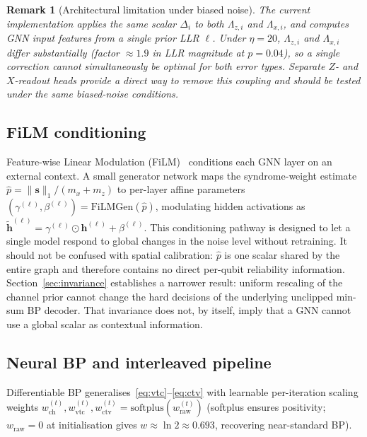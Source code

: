 \documentclass[a4paper,twocolumn,11pt,nopdfoutputerror]{quantumarticle}
\newcommand{\synd}{\mathbf{s}}
\newcommand{\llr}{\Lambda}
\newcommand{\bvec}[1]{\mathbf{#1}}
\newcommand{\phat}{\hat{p}}
\newtheorem{remark}{Remark}
\begin{document}
\begin{remark}[Architectural limitation under biased noise]
The current implementation applies the same scalar $\Delta_i$ to
both $\llr_{z,i}$ and $\llr_{x,i}$, and computes GNN input
features from a single prior LLR $\ell$. Under $\eta = 20$, $\llr_{z,i}$
and $\llr_{x,i}$ differ substantially (factor $\approx 1.9$ in
LLR magnitude at $p=0.04$), so a single correction cannot
simultaneously be optimal for both error types. Separate $Z$- and
$X$-readout heads provide a direct way to remove this coupling and should
be tested under the same biased-noise conditions.
\end{remark}

\subsection{FiLM conditioning}\label{sec:film}

Feature-wise Linear Modulation (FiLM)~\cite{Perez2018FiLM} conditions
each GNN layer on an external context. A small generator network maps
the syndrome-weight estimate
$\phat = \|\synd\|_1 / (m_x + m_z)$ to per-layer affine
parameters $(\gamma^{(\ell)}, \beta^{(\ell)}) = \mathrm{FiLMGen}(\phat)$,
modulating hidden activations as
$\tilde{\bvec{h}}^{(\ell)} = \gamma^{(\ell)} \odot \bvec{h}^{(\ell)} + \beta^{(\ell)}$.
This conditioning pathway is designed to let a single model respond to
global changes in the noise level without retraining. It should not be
confused with spatial calibration: $\phat$ is one scalar shared by the
entire graph and therefore contains no direct per-qubit reliability
information. Section~\ref{sec:invariance} establishes a narrower result:
uniform rescaling of the channel prior cannot change the hard decisions
of the underlying unclipped min-sum BP decoder. That invariance does not,
by itself, imply that a GNN cannot use a global scalar as contextual
information.

\subsection{Neural BP and interleaved pipeline}\label{sec:neuralbp}

Differentiable BP generalises~\eqref{eq:vtc}--\eqref{eq:ctv} with
learnable per-iteration scaling weights $w_\mathrm{ch}^{(t)},
w_\mathrm{vtc}^{(t)}, w_\mathrm{ctv}^{(t)} = \mathrm{softplus}(w_\mathrm{raw}^{(t)})$
(softplus ensures positivity; $w_\mathrm{raw}=0$ at initialisation
gives $w \approx \ln 2 \approx 0.693$, recovering near-standard BP).
\end{document}

